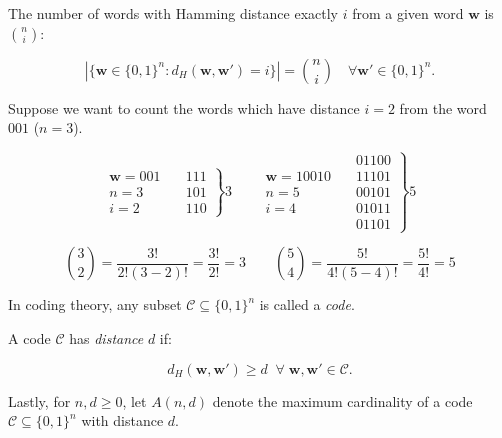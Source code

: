 \begin{proposition}
    The number of words with Hamming distance exactly $i$ from a given word $\mathbf{w}$ is ${ n \choose i }$:

    \begin{equation}
        |\{ \mathbf{w} \in \{0,1\}^n : d_H(\mathbf{w},\mathbf{w}') = i\}| = {n \choose i}\quad \forall \mathbf{w'} \in \{0,1\}^n.
    \end{equation}
\end{proposition}
\begin{example}
    Suppose we want to count the words which have distance $i=2$ from the word $001$ ($n=3$).
    
    \begin{equation}
        \begin{aligned}
            \mathbf{w} = 001 \\
            n = 3 \\
            i = 2 
        \end{aligned}
        \quad
        \left.\begin{aligned}
            111\\
            101\\
            110
        \end{aligned}
        \right\} 3
        \quad\quad
        \begin{aligned}
            \mathbf{w} = 10010 \\
            n = 5 \\
            i = 4
        \end{aligned}
        \quad
        \left.\begin{aligned}
            01100\\
            11101\\
            00101\\
            01011\\
            01101
        \end{aligned}
        \right\} 5
    \end{equation}

    \begin{equation}
        {3 \choose 2} = \frac{3!}{2!(3-2)!}=\frac{3!}{2!}=3
        \quad\quad
        {5 \choose 4} = \frac{5!}{4!(5-4)!}=\frac{5!}{4!}=5
    \end{equation}

\end{example}

\begin{definition}
In coding theory, any subset $\mathcal{C} \subseteq \{0,1\}^n$ is called a \emph{code}.

A code $\mathcal{C}$ has \emph{distance} $d$ if:

\begin{equation}
    d_H(\textbf{w}, \textbf{w}') \geq d \;\; \forall \;\textbf{w}, \textbf{w}' \in \mathcal{C}.
\end{equation}

Lastly, for $n, d \geq 0$, let $A(n,d)$ denote the maximum cardinality of a code $\mathcal{C} \subseteq \{0,1\}^n$ with distance $d$.
\end{definition}

